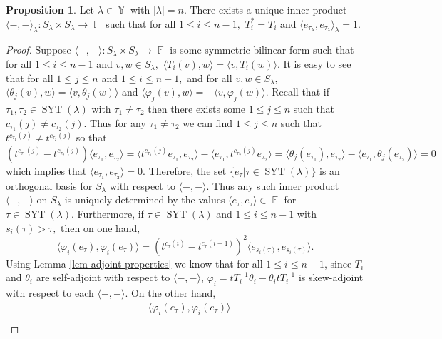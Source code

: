 \documentclass[12pt,reqno]{amsart}
\theoremstyle{definition}
\newtheorem{prop}[thm]{Proposition}
\DeclareMathOperator{\bF}{\mathbb{F}}
\DeclareMathOperator{\SYT}{\mathrm{SYT}}
\DeclareMathOperator{\Par}{\mathbb{Y}}
\begin{document}
\begin{prop}
    Let $\lambda \in \Par$ with $|\lambda| = n.$ There exists a unique inner product $\langle-,-\rangle_{\lambda}: S_{\lambda} \times S_{\lambda} \rightarrow \bF$ such that for all $1\leq i \leq n-1, $ $T_i^* = T_i$ and $\langle e_{\tau_{\lambda}}, e_{\tau_{\lambda}} \rangle_{\lambda} = 1.$ 
\end{prop}
\begin{proof}
    Suppose $\langle - , - \rangle:S_{\lambda} \times S_{\lambda} \rightarrow \bF$ is some symmetric bilinear form such that for all $1\leq i \leq n-1$ and $v,w \in S_{\lambda},$ $\langle T_i(v),w\rangle = \langle v, T_{i}(w) \rangle.$ It is easy to see that for all $1\leq j \leq n$ and $1\leq i \leq n-1,$ and for all $v, w\in S_{\lambda}, $ $\langle \theta_j(v), w\rangle = \langle v, \theta_j(w) \rangle$ and $\langle \varphi_j(v), w\rangle = - \langle v, \varphi_j(w) \rangle.$ Recall that if $\tau_1, \tau_2 \in \SYT(\lambda)$ with $\tau_1 \neq \tau_2$ then there exists some $1\leq j \leq n$ such that $c_{\tau_1}(j) \neq c_{\tau_2}(j).$ Thus for any $\tau_1 \neq \tau_2$ we can find $1\leq j \leq n$ such that $t^{c_{\tau_1}(j)} \neq t^{c_{\tau_2}(j)}$ so that 
    $$(t^{c_{\tau_1}(j)} - t^{c_{\tau_2}(j)}) \langle e_{\tau_1},e_{\tau_2}\rangle = \langle t^{c_{\tau_1}(j)}e_{\tau_1},e_{\tau_2}\rangle - \langle e_{\tau_1},t^{c_{\tau_2}(j)}e_{\tau_2}\rangle = \langle \theta_j(e_{\tau_1}),e_{\tau_2}\rangle - \langle e_{\tau_1},\theta_j(e_{\tau_2})\rangle = 0$$ which implies that $\langle e_{\tau_1},e_{\tau_2}\rangle = 0.$ Therefore, the set $\{e_{\tau}| \tau \in \SYT(\lambda) \}$ is an orthogonal basis for $S_{\lambda}$ with respect to $\langle - , - \rangle$. Thus any such inner product $\langle-,-\rangle$ on $S_{\lambda}$ is uniquely determined by the values $\langle e_{\tau}, e_{\tau} \rangle\in \bF$ for $\tau \in \SYT(\lambda).$ Furthermore, if $\tau \in \SYT(\lambda)$ and $1\leq i \leq n-1$ with $s_i(\tau) > \tau,$ then on one hand,
    $$\langle \varphi_i(e_{\tau}), \varphi_i(e_{\tau}) \rangle = (t^{c_{\tau}(i)}-t^{c_{\tau}(i+1)})^2\langle e_{s_i(\tau)}, e_{s_i(\tau)} \rangle.$$ 
    Using Lemma \ref{lem adjoint properties} we know that for all $1\leq i \leq n-1$, since $T_i$ and $\theta_{i}$ are self-adjoint with respect to $\langle -,- \rangle$, $\varphi_i = tT_{i}^{-1}\theta_i - \theta_i tT_{i}^{-1}$ is skew-adjoint with respect to each $\langle -,- \rangle.$ On the other hand, 
    \begin{align*}
        &\langle \varphi_i(e_{\tau}), \varphi_i(e_{\tau}) \rangle\\

\end{align*}
\end{proof}
\end{document}
